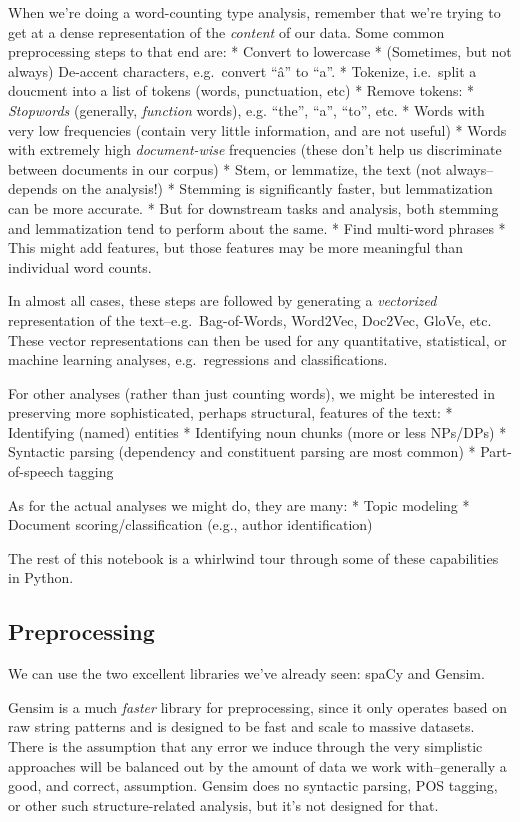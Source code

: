 \documentclass[11pt]{article}
\begin{document}
When we're doing a word-counting type analysis, remember that we're
trying to get at a dense representation of the \emph{content} of our
data. Some common preprocessing steps to that end are: * Convert to
lowercase * (Sometimes, but not always) De-accent characters,
e.g.~convert ``â'' to ``a''. * Tokenize, i.e.~split a doucment into a
list of tokens (words, punctuation, etc) * Remove tokens: *
\emph{Stopwords} (generally, \emph{function} words), e.g. ``the'',
``a'', ``to'', etc. * Words with very low frequencies (contain very
little information, and are not useful) * Words with extremely high
\emph{document-wise} frequencies (these don't help us discriminate
between documents in our corpus) * Stem, or lemmatize, the text (not
always--depends on the analysis!) * Stemming is significantly faster,
but lemmatization can be more accurate. * But for downstream tasks and
analysis, both stemming and lemmatization tend to perform about the
same. * Find multi-word phrases * This might add features, but those
features may be more meaningful than individual word counts.

In almost all cases, these steps are followed by generating a
\emph{vectorized} representation of the text--e.g.~Bag-of-Words,
Word2Vec, Doc2Vec, GloVe, etc. These vector representations can then be
used for any quantitative, statistical, or machine learning analyses,
e.g.~regressions and classifications.

For other analyses (rather than just counting words), we might be
interested in preserving more sophisticated, perhaps structural,
features of the text: * Identifying (named) entities * Identifying noun
chunks (more or less NPs/DPs) * Syntactic parsing (dependency and
constituent parsing are most common) * Part-of-speech tagging

As for the actual analyses we might do, they are many: * Topic modeling
* Document scoring/classification (e.g., author identification)

The rest of this notebook is a whirlwind tour through some of these
capabilities in Python.

    \hypertarget{preprocessing}{%
\subsection{Preprocessing}\label{preprocessing}}

We can use the two excellent libraries we've already seen: spaCy and
Gensim.

Gensim is a much \emph{faster} library for preprocessing, since it only
operates based on raw string patterns and is designed to be fast and
scale to massive datasets. There is the assumption that any error we
induce through the very simplistic approaches will be balanced out by
the amount of data we work with--generally a good, and correct,
assumption. Gensim does no syntactic parsing, POS tagging, or other such
structure-related analysis, but it's not designed for that.
\end{document}
